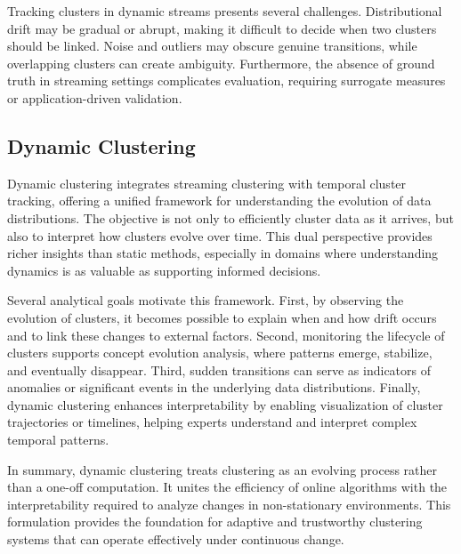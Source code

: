 Tracking clusters in dynamic streams presents several challenges.
Distributional drift may be gradual or abrupt, making it difficult to decide
when two clusters should be linked. Noise and outliers may obscure genuine
transitions, while overlapping clusters can create ambiguity. Furthermore, the
absence of ground truth in streaming settings complicates evaluation, requiring
surrogate measures or application-driven validation.

\subsection{Dynamic Clustering}\label{subsec:dynamic_clustering}

Dynamic clustering integrates streaming clustering with temporal cluster
tracking, offering a unified framework for understanding the evolution of data
distributions. The objective is not only to efficiently cluster data as it
arrives, but also to interpret how clusters evolve over time. This dual
perspective provides richer insights than static methods, especially in domains
where understanding dynamics is as valuable as supporting informed decisions.

Several analytical goals motivate this framework. First, by observing the
evolution of clusters, it becomes possible to explain when and how drift occurs
and to link these changes to external factors. Second, monitoring the lifecycle
of clusters supports concept evolution analysis, where patterns emerge,
stabilize, and eventually disappear. Third, sudden transitions can serve as
indicators of anomalies or significant events in the underlying data
distributions. Finally, dynamic clustering enhances interpretability by
enabling visualization of cluster trajectories or timelines, helping experts
understand and interpret complex temporal patterns.

In summary, dynamic clustering treats clustering as an evolving process rather
than a one-off computation. It unites the efficiency of online algorithms with
the interpretability required to analyze changes in non-stationary
environments. This formulation provides the foundation for adaptive and
trustworthy clustering systems that can operate effectively under continuous
change.


